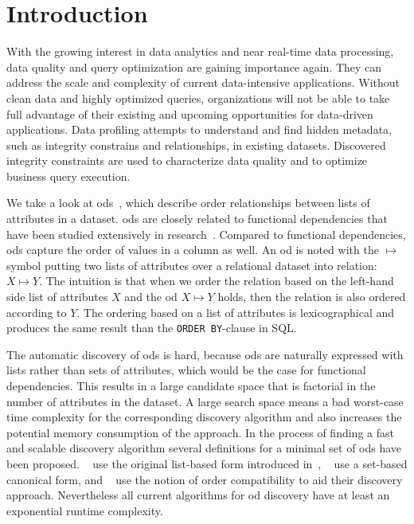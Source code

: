 
\section{Introduction}\label{sec:intro}

  With the growing interest in data analytics and near real-time data processing, data quality and query optimization are gaining importance again.
  They can address the scale and complexity of current data-intensive applications.
  Without clean data and highly optimized queries, organizations will not be able to take full advantage of their existing and upcoming opportunities for data-driven applications.
  Data profiling attempts to understand and find hidden metadata, such as integrity constrains and relationships, in existing datasets.
  Discovered integrity constraints are used to characterize data quality and to optimize business query execution.

  We take a look at \glspl{od}~\cite{ginsburg,szlichta:fundamentals}, which describe order relationships between lists of attributes in a dataset.
  \glspl{od} are closely related to functional dependencies that have been studied extensively in research~\cite{dependencies:review}.
  Compared to functional dependencies, \glspl{od} capture the order of values in a column as well.
  An \gls{od} is noted with the $\mapsto$ symbol putting two lists of attributes over a relational dataset into relation: $X \mapsto Y$.
  The intuition is that when we order the relation based on the left-hand side list of attributes $X$ and the \gls{od} $X \mapsto Y$ holds, then the relation is also ordered according to $Y$.
  The ordering based on a list of attributes is lexicographical and produces the same result than the \texttt{ORDER BY}-clause in SQL.

  The automatic discovery of \glspl{od} is hard, because \glspl{od} are naturally expressed with lists rather than sets of attributes, which would be the case for functional dependencies.
  This results in a large candidate space that is factorial in the number of attributes in the dataset.
  A large search space means a bad worst-case time complexity for the corresponding discovery algorithm and also increases the potential memory consumption of the approach.
  In the process of finding a fast and scalable discovery algorithm several definitions for a minimal set of \glspl{od} have been proposed.
  ~\cite{langer} use the original list-based form introduced in~\cite{szlichta:fundamentals}, \citeauthor{szlichta:discovery}~\cite{szlichta:discovery} use a set-based canonical form, and \citeauthor{consonni}~\cite{consonni} use the notion of order compatibility to aid their discovery approach.
  Nevertheless all current algorithms for \gls{od} discovery have at least an exponential runtime complexity.

